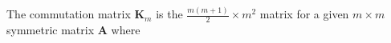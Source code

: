 The commutation matrix
$\mathbf{K}_{m}$
is the
$\frac{m \left( m + 1 \right)}{2} \times m^2$ 
matrix
for a given
$m \times m$
symmetric matrix
$\mathbf{A}$
where